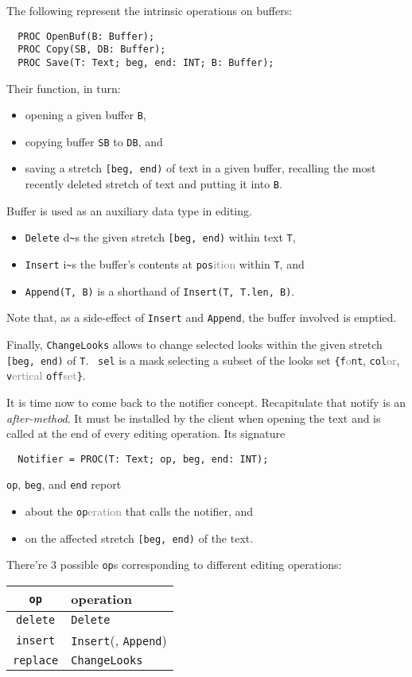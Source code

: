 The following represent the intrinsic operations on buffers:
\begin{verbatim}
  PROC OpenBuf(B: Buffer);
  PROC Copy(SB, DB: Buffer);
  PROC Save(T: Text; beg, end: INT; B: Buffer);
\end{verbatim}
Their function, in turn:
\begin{itemize}
  \item opening a given buffer \verb|B|,
  \item copying buffer \verb|SB| to \verb|DB|, and
  \item saving a stretch \verb|[beg, end)| of text in a given buffer,
    recalling the most recently deleted stretch of text and putting it into \verb|B|.
\end{itemize}

Buffer is used as an auxiliary data type in editing.
\begin{itemize}
  \item \verb|Delete| d\verb|~|s the given stretch \verb|[beg, end)| within text \verb|T|,
  \item \verb|Insert| i\verb|~|s the buffer's contents at \verb|pos|\textcolor{gray}{ition}
    within \verb|T|, and
  \item \verb|Append(T, B)| is a shorthand of \verb|Insert(T, T.len, B)|.
\end{itemize}
Note that, as a side-effect of \verb|Insert| and \verb|Append|, the buffer involved is emptied.

Finally, \verb|ChangeLooks| allows to change selected looks
within the given stretch \verb|[beg, end)| of \verb|T|.
\verb| sel| is a mask selecting a subset of the looks set
\verb|{f|\textcolor{gray}{o}\verb|nt|, \verb|col|\textcolor{gray}{or},
\verb|v|\textcolor{gray}{ertical} \verb|off|\textcolor{gray}{set}\verb|}|.

It is time now to come back to the notifier concept.
Recapitulate that notify is an \emph{after-method}.
It must be installed by the client when opening the text
and is called at the end of every editing operation.
Its signature
\begin{verbatim}
  Notifier = PROC(T: Text; op, beg, end: INT);
\end{verbatim}
\verb|op|, \verb|beg|, and \verb|end| report
\begin{itemize}
  \item about the \verb|op|\textcolor{gray}{eration} that calls the notifier, and
  \item on the affected stretch \verb|[beg, end)| of the text.
\end{itemize}
There're 3 possible \verb|op|s corresponding to different editing operations:
\begin{table}[h!]
  \centering
  \begin{tabular}{c l}
    \verb|op|     & operation \\\hline
    \verb|delete| & \verb|Delete| \\
    \verb|insert| & \verb|Insert|(, \verb|Append|) \\
    \verb|replace|& \verb|ChangeLooks|
  \end{tabular}
\end{table}

